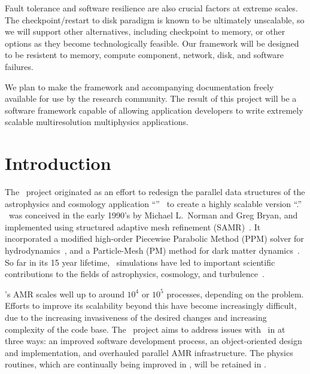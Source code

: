 \documentclass[10pt,twocolumn]{article}
\begin{document}
Fault tolerance and software resilience are also crucial factors at
extreme scales.  The checkpoint/restart to disk paradigm is known to
be ultimately unscalable, so we will support other alternatives,
including checkpoint to memory, or other options as they become
technologically feasible.  Our framework will be designed to be
resistent to memory, compute component, network, disk, and software
failures.

We plan to make the framework and accompanying documentation freely
available for use by the research community.  The result of this
project will be a software framework capable of allowing application
developers to write extremely scalable multiresolution multiphysics
applications.

\section{Introduction} \label{s:intro}


The \cello\ project originated as an effort to redesign the parallel
data structures of the astrophysics and cosmology application
``\enzo''~\cite{OsBr04} to create a highly scalable version
``\enzoii.''  \enzo\ was conceived in the early 1990's by Michael
L.~Norman and Greg Bryan, and implemented using structured adaptive
mesh refinement (SAMR)~\cite{BeCo89}.  It incorporated a modified
high-order Piecewise Parabolic Method (PPM) solver for
hydrodynamics~\cite{WoCo84b}, and a Particle-Mesh (PM) method for dark
matter dynamics~\cite{@@@PM}.  So far in its 15 year lifetime, \enzo\
simulations have led to important scientific contributions to the
fields of astrophysics, cosmology, and
turbulence~\cite{@@@enzo-science}.

\enzo's AMR scales well up to around $10^4$ or $10^5$ processes,
depending on the problem.  Efforts to improve its scalability beyond
this have become increasingly difficult, due to the increasing
invasiveness of the desired changes and increasing complexity of the
code base.  The \cello\ project aims to address issues with \enzo\ in
at three ways: an improved software development process, an
object-oriented design and implementation, and overhauled parallel AMR
infrastructure.  The physics routines, which are continually being
improved in \enzo, will be retained in \enzoii.
\end{document}
